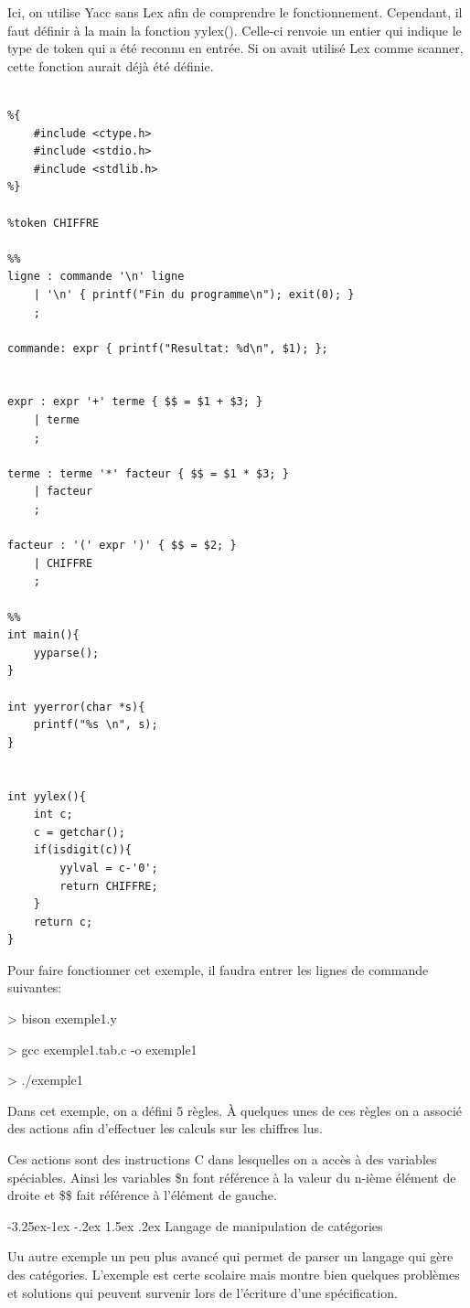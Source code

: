 \documentclass{article}
\makeatletter
\newcounter {subsubsubsection}[subsubsection]
\newcommand\subsubsubsection{\@startsection{subsubsubsection}{4}{\z@}%
                                     {-3.25ex\@plus -1ex \@minus -.2ex}%
                                     {1.5ex \@plus .2ex}%
                                     {\normalfont\normalsize\bfseries}}
\makeatother
\begin{document}
Ici, on utilise Yacc sans Lex afin de comprendre le fonctionnement. Cependant, il faut définir à la main la fonction yylex(). Celle-ci renvoie un entier qui indique le type de token qui a été reconnu en entrée. Si on avait utilisé Lex comme scanner, cette fonction aurait déjà été définie.

\begin{verbatim}

%{
    #include <ctype.h>
    #include <stdio.h>
    #include <stdlib.h>
%}

%token CHIFFRE

%%
ligne : commande '\n' ligne
    | '\n' { printf("Fin du programme\n"); exit(0); }
    ;

commande: expr { printf("Resultat: %d\n", $1); };


expr : expr '+' terme { $$ = $1 + $3; }
    | terme
    ;
   
terme : terme '*' facteur { $$ = $1 * $3; }
    | facteur
    ;
   
facteur : '(' expr ')' { $$ = $2; }
    | CHIFFRE
    ;

%%
int main(){
    yyparse();   
}

int yyerror(char *s){
    printf("%s \n", s);
}


int yylex(){
    int c;
    c = getchar();
    if(isdigit(c)){
        yylval = c-'0';
        return CHIFFRE;
    }
    return c;
}

\end{verbatim}

Pour faire fonctionner cet exemple, il faudra entrer les lignes de commande suivantes:

> bison exemple1.y

> gcc exemple1.tab.c -o exemple1

> ./exemple1

Dans cet exemple, on a défini 5 règles. À quelques unes de ces règles on a associé des actions afin d’effectuer les calculs sur les chiffres lus.

Ces actions sont des instructions C dans lesquelles on a accès à des variables spéciables.
Ainsi les variables \$n font référence à la valeur du n-ième élément de droite et \$\$ fait référence à l’élément de gauche.


\subsubsubsection{ Langage de manipulation de catégories }

Uu autre exemple un peu plus avancé qui permet de parser un langage qui gère des catégories. L'exemple est certe scolaire mais montre bien quelques problèmes et solutions qui peuvent survenir lors de l'écriture d'une spécification.
\end{document}
